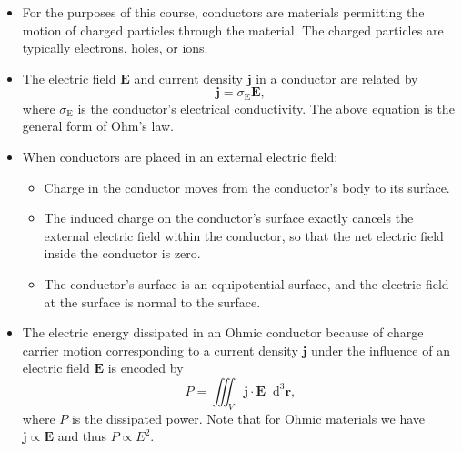 \documentclass[11pt, a4paper]{article}
\newcommand{\diff}{\mathop{}\!\mathrm{d}} %
\newcommand{\dr}{\diff^{3} \r}  %
\renewcommand{\vec}[1]{\bm{#1}} %
\renewcommand{\r}{\vec{r}}
\newcommand{\E}{\vec{E}} %
\renewcommand{\j}{\vec{j}}  %
\begin{document}
\begin{itemize}

	\item For the purposes of this course, conductors are materials permitting the motion of charged particles through the material. The charged particles are typically electrons, holes, or ions.

    \item The electric field $ \E $ and current density $ \j $ in a conductor are related by
    \begin{equation*}
        \j = \sigma_{\text{E}} \E,
    \end{equation*}
    where $ \sigma_{\text{E}} $ is the conductor's electrical conductivity. The above equation is the general form of Ohm's law.
    
    \item When conductors are placed in an external electric field:
    \begin{itemize}
        \item Charge in the conductor moves from the conductor's body to its surface.

        \item The induced charge on the conductor's surface exactly cancels the external electric field within the conductor, so that the net electric field inside the conductor is zero.

        \item The conductor's surface is an equipotential surface, and the electric field at the surface is normal to the surface.
    \end{itemize}
    
    \item The electric energy dissipated in an Ohmic conductor because of charge carrier motion corresponding to a current density $ \j $ under the influence of an electric field $ \E $ is encoded by
    \begin{equation*}
        P = \iiint_{V} \j \cdot \E \dr,
    \end{equation*}
    where $ P $ is the dissipated power. Note that for Ohmic materials we have $ \j \propto \E $ and thus $ P \propto E^{2} $. 
\end{itemize}
\end{document}
